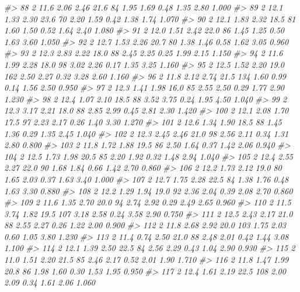 \documentclass[]{book}
\newenvironment{Shaded}{\begin{snugshade}}{\end{snugshade}}
\newcommand{\CommentTok}[1]{\textcolor[rgb]{0.56,0.35,0.01}{\textit{#1}}}
\begin{document}
\begin{Shaded}
\begin{Highlighting}[]
\CommentTok{#> 88   2   11.6  2.06  2.46  21.6   84 1.95  1.69 0.48  1.35  2.80 1.000}
\CommentTok{#> 89   2   12.1  1.33  2.30  23.6   70 2.20  1.59 0.42  1.38  1.74 1.070}
\CommentTok{#> 90   2   12.1  1.83  2.32  18.5   81 1.60  1.50 0.52  1.64  2.40 1.080}
\CommentTok{#> 91   2   12.0  1.51  2.42  22.0   86 1.45  1.25 0.50  1.63  3.60 1.050}
\CommentTok{#> 92   2   12.7  1.53  2.26  20.7   80 1.38  1.46 0.58  1.62  3.05 0.960}
\CommentTok{#> 93   2   12.3  2.83  2.22  18.0   88 2.45  2.25 0.25  1.99  2.15 1.150}
\CommentTok{#> 94   2   11.6  1.99  2.28  18.0   98 3.02  2.26 0.17  1.35  3.25 1.160}
\CommentTok{#> 95   2   12.5  1.52  2.20  19.0  162 2.50  2.27 0.32  3.28  2.60 1.160}
\CommentTok{#> 96   2   11.8  2.12  2.74  21.5  134 1.60  0.99 0.14  1.56  2.50 0.950}
\CommentTok{#> 97   2   12.3  1.41  1.98  16.0   85 2.55  2.50 0.29  1.77  2.90 1.230}
\CommentTok{#> 98   2   12.4  1.07  2.10  18.5   88 3.52  3.75 0.24  1.95  4.50 1.040}
\CommentTok{#> 99   2   12.3  3.17  2.21  18.0   88 2.85  2.99 0.45  2.81  2.30 1.420}
\CommentTok{#> 100  2   12.1  2.08  1.70  17.5   97 2.23  2.17 0.26  1.40  3.30 1.270}
\CommentTok{#> 101  2   12.6  1.34  1.90  18.5   88 1.45  1.36 0.29  1.35  2.45 1.040}
\CommentTok{#> 102  2   12.3  2.45  2.46  21.0   98 2.56  2.11 0.34  1.31  2.80 0.800}
\CommentTok{#> 103  2   11.8  1.72  1.88  19.5   86 2.50  1.64 0.37  1.42  2.06 0.940}
\CommentTok{#> 104  2   12.5  1.73  1.98  20.5   85 2.20  1.92 0.32  1.48  2.94 1.040}
\CommentTok{#> 105  2   12.4  2.55  2.27  22.0   90 1.68  1.84 0.66  1.42  2.70 0.860}
\CommentTok{#> 106  2   12.2  1.73  2.12  19.0   80 1.65  2.03 0.37  1.63  3.40 1.000}
\CommentTok{#> 107  2   12.7  1.75  2.28  22.5   84 1.38  1.76 0.48  1.63  3.30 0.880}
\CommentTok{#> 108  2   12.2  1.29  1.94  19.0   92 2.36  2.04 0.39  2.08  2.70 0.860}
\CommentTok{#> 109  2   11.6  1.35  2.70  20.0   94 2.74  2.92 0.29  2.49  2.65 0.960}
\CommentTok{#> 110  2   11.5  3.74  1.82  19.5  107 3.18  2.58 0.24  3.58  2.90 0.750}
\CommentTok{#> 111  2   12.5  2.43  2.17  21.0   88 2.55  2.27 0.26  1.22  2.00 0.900}
\CommentTok{#> 112  2   11.8  2.68  2.92  20.0  103 1.75  2.03 0.60  1.05  3.80 1.230}
\CommentTok{#> 113  2   11.4  0.74  2.50  21.0   88 2.48  2.01 0.42  1.44  3.08 1.100}
\CommentTok{#> 114  2   12.1  1.39  2.50  22.5   84 2.56  2.29 0.43  1.04  2.90 0.930}
\CommentTok{#> 115  2   11.0  1.51  2.20  21.5   85 2.46  2.17 0.52  2.01  1.90 1.710}
\CommentTok{#> 116  2   11.8  1.47  1.99  20.8   86 1.98  1.60 0.30  1.53  1.95 0.950}
\CommentTok{#> 117  2   12.4  1.61  2.19  22.5  108 2.00  2.09 0.34  1.61  2.06 1.060}

\end{Highlighting}
\end{Shaded}
\end{document}

